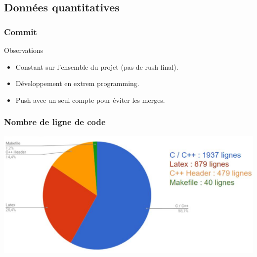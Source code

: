     \subsection{Données quantitatives}

        \begin{frame}
            \frametitle{Commit}
            \begin{exampleblock}{Observations}
                \begin{itemize}
                    \item Constant sur l'ensemble du projet (pas de rush final).
                    \item Développement en extrem programming.
                    \item Push avec un seul compte pour éviter les merges.
                \end{itemize}
            \end{exampleblock}
        \end{frame}

        \begin{frame}
            \frametitle{Nombre de ligne de code}
            \includegraphics[width=\linewidth]{./rsc/lignes_code.png}
        \end{frame}

